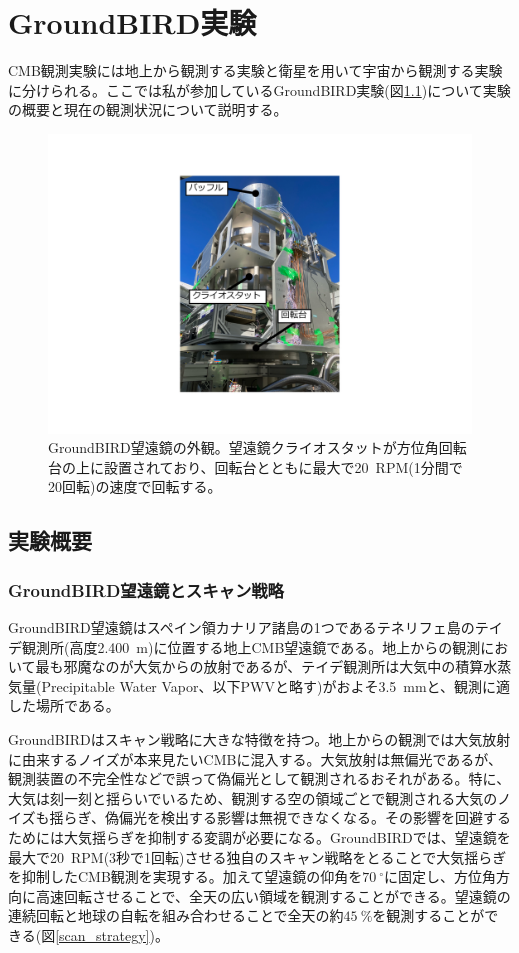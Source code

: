 \chapter{GroundBIRD実験}
\label{chapter2}

CMB観測実験には地上から観測する実験と衛星を用いて宇宙から観測する実験に分けられる。ここでは私が参加しているGroundBIRD実験(図\ref{GB_overview})について実験の概要と現在の観測状況について説明する。

\begin{figure}[htbp]
  \centering
  \includegraphics[width=0.5\columnwidth]{3_GB/figs/GB_overview2.pdf}
  \caption{GroundBIRD望遠鏡の外観。望遠鏡クライオスタットが方位角回転台の上に設置されており、回転台とともに最大で\SI{20}{RPM}(1分間で20回転)の速度で回転する。}
  \label{GB_overview}
\end{figure}
\section{実験概要}

\subsection{GroundBIRD望遠鏡とスキャン戦略}
GroundBIRD望遠鏡はスペイン領カナリア諸島の1つであるテネリフェ島のテイデ観測所(高度\SI{2,400}{m})に位置する地上CMB望遠鏡である。地上からの観測において最も邪魔なのが大気からの放射であるが、テイデ観測所は大気中の積算水蒸気量(Precipitable Water Vapor、以下PWVと略す)がおよそ\SI{3.5}{mm}\cite{PWV}と、観測に適した場所である。

GroundBIRDはスキャン戦略に大きな特徴を持つ。地上からの観測では大気放射に由来するノイズが本来見たいCMBに混入する。大気放射は無偏光であるが、観測装置の不完全性などで誤って偽偏光として観測されるおそれがある。特に、大気は刻一刻と揺らいでいるため、観測する空の領域ごとで観測される大気のノイズも揺らぎ、偽偏光を検出する影響は無視できなくなる。その影響を回避するためには大気揺らぎを抑制する変調が必要になる。GroundBIRDでは、望遠鏡を最大で\SI{20}{RPM}(3秒で1回転)させる独自のスキャン戦略をとることで大気揺らぎを抑制したCMB観測を実現する。加えて望遠鏡の仰角を$\SI{70}{^{\circ}}$に固定し、方位角方向に高速回転させることで、全天の広い領域を観測することができる。望遠鏡の連続回転と地球の自転を組み合わせることで全天の約$\SI{45}{\%}$を観測することができる(図\ref{scan_strategy})。


